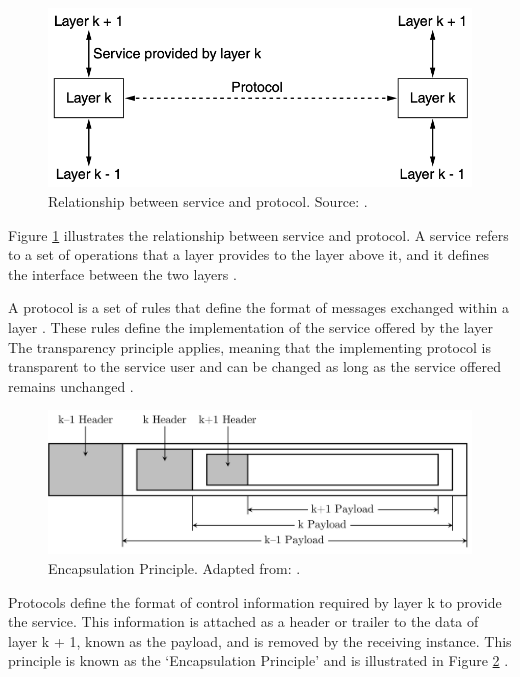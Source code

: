 \begin{figure}[h]
    \centering
    \includegraphics[width=0.7\linewidth]{figures/tcpip_refmodel/image1.png}
    \caption[Relationship between service and protocol]{Relationship between service and protocol. Source: \cite{Tanenbaum2010}.}
    \label{fig:ServiceProtRelation}
\end{figure}

Figure \ref{fig:ServiceProtRelation} illustrates the relationship between service and protocol. A service refers to a set of operations that a layer provides to the layer above it, and it defines the interface between the two layers \cite{Tanenbaum2010}.

A protocol is a set of rules that define the format of messages exchanged within a layer \cite{Tanenbaum2010}. These rules define the implementation of the service offered by the layer The transparency principle applies, meaning that the implementing protocol is transparent to the service user and can be changed as long as the service offered remains unchanged \cite{Weigel2021}.

\begin{figure}[h!]
    \centering
    \includegraphics[width=1\linewidth]{figures/tcpip_refmodel/image2.pdf}
    \caption[Encapsulation Principle]{Encapsulation Principle. Adapted from: \cite{Tanenbaum2010}.}
    \label{fig:EncapsulationPrinciple}
\end{figure}

Protocols define the format of control information required by layer k to provide the service. This information is attached as a header or trailer to the data of layer k + 1, known as the payload, and is removed by the receiving instance. This principle is known as the `Encapsulation Principle' and is illustrated in Figure \ref{fig:EncapsulationPrinciple} \cite{Tanenbaum2010}.



